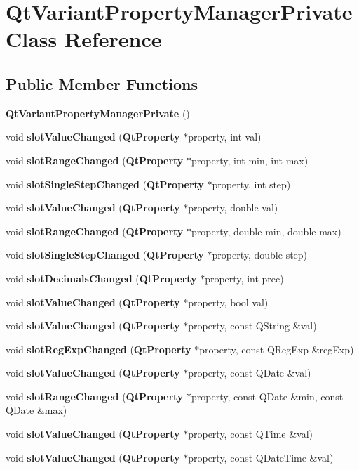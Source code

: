 \section{Qt\+Variant\+Property\+Manager\+Private Class Reference}
\label{classQtVariantPropertyManagerPrivate}
\subsection*{Public Member Functions}
\begin{DoxyCompactItemize}
\item 
{\bf Qt\+Variant\+Property\+Manager\+Private} ()
\item 
void {\bf slot\+Value\+Changed} ({\bf Qt\+Property} $\ast$property, int val)
\item 
void {\bf slot\+Range\+Changed} ({\bf Qt\+Property} $\ast$property, int min, int max)
\item 
void {\bf slot\+Single\+Step\+Changed} ({\bf Qt\+Property} $\ast$property, int step)
\item 
void {\bf slot\+Value\+Changed} ({\bf Qt\+Property} $\ast$property, double val)
\item 
void {\bf slot\+Range\+Changed} ({\bf Qt\+Property} $\ast$property, double min, double max)
\item 
void {\bf slot\+Single\+Step\+Changed} ({\bf Qt\+Property} $\ast$property, double step)
\item 
void {\bf slot\+Decimals\+Changed} ({\bf Qt\+Property} $\ast$property, int prec)
\item 
void {\bf slot\+Value\+Changed} ({\bf Qt\+Property} $\ast$property, bool val)
\item 
void {\bf slot\+Value\+Changed} ({\bf Qt\+Property} $\ast$property, const Q\+String \&val)
\item 
void {\bf slot\+Reg\+Exp\+Changed} ({\bf Qt\+Property} $\ast$property, const Q\+Reg\+Exp \&reg\+Exp)
\item 
void {\bf slot\+Value\+Changed} ({\bf Qt\+Property} $\ast$property, const Q\+Date \&val)
\item 
void {\bf slot\+Range\+Changed} ({\bf Qt\+Property} $\ast$property, const Q\+Date \&min, const Q\+Date \&max)
\item 
void {\bf slot\+Value\+Changed} ({\bf Qt\+Property} $\ast$property, const Q\+Time \&val)
\item 
void {\bf slot\+Value\+Changed} ({\bf Qt\+Property} $\ast$property, const Q\+Date\+Time \&val)

\end{DoxyCompactItemize}
